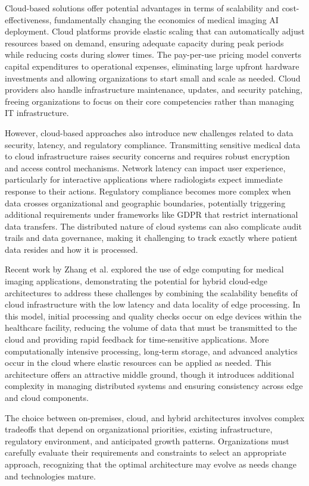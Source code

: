 \documentclass[12pt,a4paper]{article}
\begin{document}
Cloud-based solutions offer potential advantages in terms of scalability and cost-effectiveness, fundamentally changing the economics of medical imaging AI deployment. Cloud platforms provide elastic scaling that can automatically adjust resources based on demand, ensuring adequate capacity during peak periods while reducing costs during slower times. The pay-per-use pricing model converts capital expenditures to operational expenses, eliminating large upfront hardware investments and allowing organizations to start small and scale as needed. Cloud providers also handle infrastructure maintenance, updates, and security patching, freeing organizations to focus on their core competencies rather than managing IT infrastructure.

However, cloud-based approaches also introduce new challenges related to data security, latency, and regulatory compliance. Transmitting sensitive medical data to cloud infrastructure raises security concerns and requires robust encryption and access control mechanisms. Network latency can impact user experience, particularly for interactive applications where radiologists expect immediate response to their actions. Regulatory compliance becomes more complex when data crosses organizational and geographic boundaries, potentially triggering additional requirements under frameworks like GDPR that restrict international data transfers. The distributed nature of cloud systems can also complicate audit trails and data governance, making it challenging to track exactly where patient data resides and how it is processed.

Recent work by Zhang et al. \cite{zhang2020medical} explored the use of edge computing for medical imaging applications, demonstrating the potential for hybrid cloud-edge architectures to address these challenges by combining the scalability benefits of cloud infrastructure with the low latency and data locality of edge processing. In this model, initial processing and quality checks occur on edge devices within the healthcare facility, reducing the volume of data that must be transmitted to the cloud and providing rapid feedback for time-sensitive applications. More computationally intensive processing, long-term storage, and advanced analytics occur in the cloud where elastic resources can be applied as needed. This architecture offers an attractive middle ground, though it introduces additional complexity in managing distributed systems and ensuring consistency across edge and cloud components.

The choice between on-premises, cloud, and hybrid architectures involves complex tradeoffs that depend on organizational priorities, existing infrastructure, regulatory environment, and anticipated growth patterns. Organizations must carefully evaluate their requirements and constraints to select an appropriate approach, recognizing that the optimal architecture may evolve as needs change and technologies mature.
\end{document}
